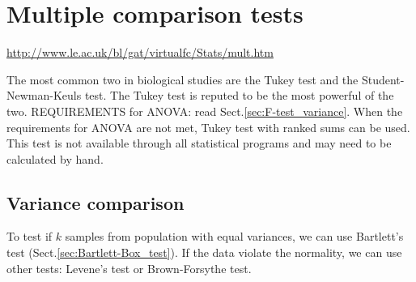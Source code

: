 \chapter{Multiple comparison tests}
\label{chap:multiple_comparison_tests}

\url{http://www.le.ac.uk/bl/gat/virtualfc/Stats/mult.htm}

The most common two in biological studies are the Tukey test and the
Student-Newman-Keuls test. The Tukey test is reputed to be the most powerful of
the two. REQUIREMENTS for ANOVA: read Sect.\ref{sec:F-test_variance}.
When the requirements for ANOVA are not met, Tukey test with ranked sums can be
used. This test is not available through all statistical programs and may need
to be calculated by hand.

\section{Variance comparison}

To test if $k$ samples from population with equal variances, we can use
Bartlett's test (Sect.\ref{sec:Bartlett-Box_test}). If the data violate the
normality, we can use other tests: Levene's test or Brown-Forsythe test. 
